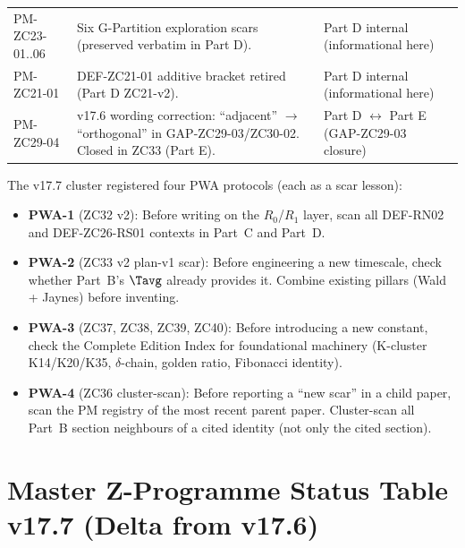 \documentclass[12pt, a4paper]{article}
\begin{document}
{\begin{longtable}{>{\raggedright\arraybackslash}p{2.7cm}
                  >{\raggedright\arraybackslash}p{5.8cm}
                  >{\raggedright\arraybackslash}p{4.0cm}}
PM-ZC23-01..06 &
  Six G-Partition exploration scars (preserved verbatim in Part D). &
  Part D internal (informational here) \\

PM-ZC21-01 &
  DEF-ZC21-01 additive bracket retired (Part D ZC21-v2). &
  Part D internal (informational here) \\

PM-ZC29-04 &
  v17.6 wording correction: ``adjacent'' $\to$ ``orthogonal'' in
  GAP-ZC29-03/ZC30-02. Closed in ZC33 (Part E). &
  Part D $\leftrightarrow$ Part E (GAP-ZC29-03 closure) \\
\end{longtable}
}

\medskip

\begin{conmapbox}[title={Pre-Work Audit Protocol (PWA) Summary}]
\sloppy
The v17.7 cluster registered four PWA protocols (each as a scar lesson):
\begin{itemize}[noitemsep,leftmargin=1.5em]
  \item \textbf{PWA-1} (ZC32 v2): Before writing on the $R_0$/$R_1$
    layer, scan all DEF-RN02 and DEF-ZC26-RS01 contexts in Part~C
    and Part~D.
  \item \textbf{PWA-2} (ZC33 v2 plan-v1 scar): Before engineering a new
    timescale, check whether Part~B's $\Tavg$ already provides it.
    Combine existing pillars (Wald + Jaynes) before inventing.
  \item \textbf{PWA-3} (ZC37, ZC38, ZC39, ZC40): Before introducing
    a new constant, check the Complete Edition Index for foundational
    machinery (K-cluster K14/K20/K35, $\delta$-chain, golden ratio,
    Fibonacci identity).
  \item \textbf{PWA-4} (ZC36 cluster-scan): Before reporting a ``new
    scar'' in a child paper, scan the PM registry of the most recent
    parent paper. Cluster-scan all Part~B section neighbours of a
    cited identity (not only the cited section).
\end{itemize}
\end{conmapbox}

\bigskip

\section{Master Z-Programme Status Table v17.7 (Delta from v17.6)}
\end{document}
